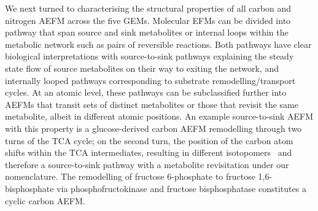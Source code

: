 \documentclass[12pt]{article}
\begin{document}
We next turned to characterising the structural properties of all carbon
and nitrogen AEFM across the five GEMs. Molecular EFMs can be divided into
pathway that span source and sink metabolites or internal loops within the
metabolic network such as pairs of reversible reactions. Both pathways
have clear biological interpretations with source-to-sink pathways
explaining the steady state flow of source metabolites on their way to
exiting the network, and internally looped pathways corresponding to
substrate remodelling/transport cycles. At an atomic level, these pathways
can be subclassified further into AEFMs that transit sets of distinct
metabolites or those that revisit the same metabolite, albeit in different
atomic positions. 
An example source-to-sink AEFM with this property is a glucose-derived
carbon AEFM remodelling through two turns of the TCA cycle; on the second
turn, the position of the carbon atom shifts within the TCA intermediates,
resulting in different isotopomers~\citep{DuanLikun20221tas} and therefore
a source-to-sink pathway with a metabolite revisitation under our
nomenclature. The remodelling of fructose 6-phosphate to fructose
1,6-bisphosphate via phosphofructokinase and fructose bisphosphatase
constitutes a cyclic carbon AEFM.
\end{document}
